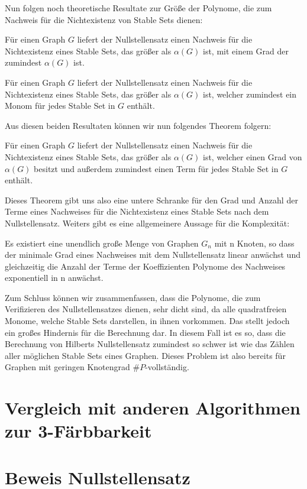 \noindent Nun folgen noch theoretische Resultate zur Größe der Polynome, die zum Nachweis für die Nichtexistenz von Stable Sets dienen:

\begin{theorem}
Für einen Graph $G$ liefert der Nullstellensatz einen Nachweis für die Nichtexistenz eines Stable Sets, das größer als $\alpha(G)$ ist, mit einem Grad der zumindest $\alpha(G)$ ist.
\end{theorem}

\begin{corollary}
Für einen Graph $G$ liefert der Nullstellensatz einen Nachweis für die Nichtexistenz eines Stable Sets, das größer als $\alpha(G)$ ist, welcher zumindest ein Monom für jedes Stable Set in $G$ enthält.
\end{corollary}

\noindent Aus diesen beiden Resultaten können wir nun folgendes Theorem folgern:

\begin{theorem}
Für einen Graph $G$ liefert der Nullstellensatz einen Nachweis für die Nichtexistenz eines Stable Sets, das größer als $\alpha(G)$ ist, welcher einen Grad von $\alpha(G)$ besitzt und außerdem zumindest einen Term für jedes Stable Set in $G$ enthält.
\end{theorem}

\noindent Dieses Theorem gibt uns also eine untere Schranke für den Grad und Anzahl der Terme eines Nachweises für die Nichtexistenz eines Stable Sets nach dem Nullstellensatz. Weiters gibt es eine allgemeinere Aussage für die Komplexität:

\begin{corollary}
Es existiert eine unendlich große Menge von Graphen $G_n$ mit n Knoten, so dass der minimale Grad eines Nachweises mit dem Nullstellensatz linear anwächst und gleichzeitig die Anzahl der Terme der Koeffizienten Polynome des Nachweises exponentiell in n anwächst.
\end{corollary}


\noindent Zum Schluss können wir zusammenfassen, dass die Polynome, die zum Verifizieren des Nullstellensatzes dienen, sehr dicht sind, da alle quadratfreien Monome, welche Stable Sets darstellen, in ihnen vorkommen.
Das stellt jedoch ein großes Hindernis für die Berechnung dar. In diesem Fall ist es so, dass die Berechnung von Hilberts Nullstellensatz zumindest so schwer ist wie das Zählen aller möglichen Stable Sets eines Graphen. Dieses Problem ist also bereits für Graphen mit geringen Knotengrad $\#P$-vollständig. 




\section{Vergleich mit anderen Algorithmen zur 3-Färbbarkeit}



\section{Beweis Nullstellensatz}

